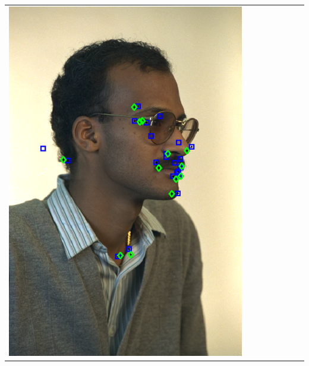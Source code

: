 \documentclass[landscape,final,a0paper,fontscale=0.27065]{baposter}
\begin{document}
\begin{poster}
{{\begin{tabular}{@{}rccccccc@{}}
 \parbox[c]{0.11\linewidth}{\includegraphics[width=\linewidth]{images/l_hr_fail.pdf}} &

\end{tabular}}}
\end{poster}
\end{document}
